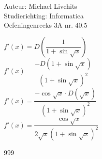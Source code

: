\documentclass[a4paper]{article}
\begin{document}
  
\noindent \large Auteur: Michael Livchits \\
\noindent \large Studierichting: Informatica\\
\noindent \large Oefeningenreeks 3A nr. 40.5\\

\medskip

\normalsize

$f'(x) = D\left(\dfrac{1}{1+\sin\sqrt{x}}\right)$\\

$f'(x) = \dfrac{-D\left(1+\sin\sqrt{x}\right)}{\left(1+\sin\sqrt{x}\right)^2}$\\

$f'(x) = \dfrac{-\cos\sqrt{x}\cdot D(\sqrt{x})}{\left(1+\sin\sqrt{x}\right)^2}$\\

$f'(x) = \dfrac{-\cos\sqrt{x}}{2\sqrt{x}\left(1+\sin\sqrt{x}\right)^2}$\\

\begin{thebibliography}{999}
\end{thebibliography}
\end{document}
